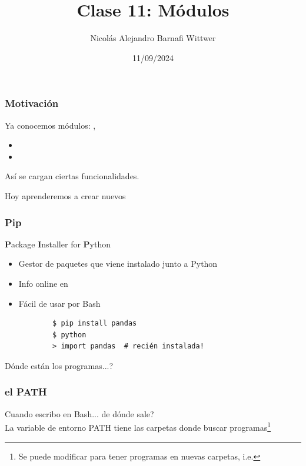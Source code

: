 \documentclass[14pt,aspectratio=169,xcolor=dvipsnames]{beamer}
\title[short title]{Clase 11: Módulos}
\subtitle{}
\author[NA Barnafi] {Nicolás Alejandro Barnafi Wittwer}
\institute[UC|CMM] 
{
    Pontificia Universidad Católica de Chile \\
    Centro de Modelamiento Matemático
}
\date{11/09/2024}
\begin{document}
\begin{frame}
    \maketitle
\end{frame}
\begin{frame}[fragile]\frametitle{Motivación}
    Ya conocemos módulos: , 
    \begin{itemize}
        \item {}
        \item {}
    \end{itemize}
    Así se cargan ciertas funcionalidades. 

    \pause Hoy aprenderemos a crear nuevos
\end{frame}
\begin{frame}[fragile]\frametitle{Pip}
    \textbf{P}ackage \textbf{I}nstaller for \textbf{P}ython
    
    \begin{itemize}
        \item Gestor de paquetes que viene instalado junto a Python
        \item Info online en 
        \item Fácil de usar por Bash
            \begin{verbatim}
        $ pip install pandas
        $ python
        > import pandas  # recién instalada!
            \end{verbatim}
    \end{itemize}
    
    \pause Dónde están los programas...?
\end{frame}
\begin{frame}\frametitle{el PATH}
    Cuando escribo  en Bash... de dónde sale? \\

    \vspace{0.5cm}
    La variable de entorno PATH tiene las carpetas donde buscar programas\footnote{Se puede modificar para tener programas en nuevas carpetas, i.e. }

    \pause {}

    
\end{frame}
\end{document}
